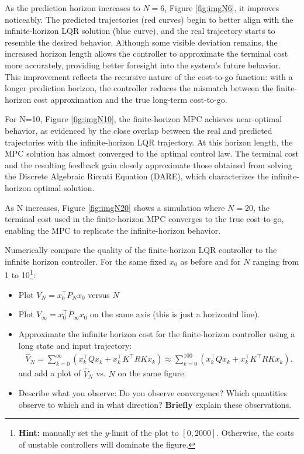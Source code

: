 \documentclass[]{article}
\begin{document}
As the prediction horizon increases to $N=6$, Figure \ref{fig:imgN6}, it improves noticeably. 
The predicted trajectories (red curves) begin to better align with the infinite-horizon LQR solution (blue curve), and the real trajectory starts to resemble the desired behavior. 
Although some visible deviation remains, the increased horizon length allows the controller to approximate the terminal cost more accurately, providing better foresight into the system's future behavior. 
This improvement reflects the recursive nature of the cost-to-go function: with a longer prediction horizon, the controller reduces the mismatch between the finite-horizon cost approximation and the true long-term cost-to-go.

For N=10, Figure \ref{fig:imgN10}, the finite-horizon MPC achieves near-optimal behavior, as evidenced by the close overlap between the real and predicted trajectories with the infinite-horizon LQR trajectory. 
At this horizon length, the MPC solution has almost converged to the optimal control law. 
The terminal cost and the resulting feedback gain closely approximate those obtained from solving the Discrete Algebraic Riccati Equation (DARE), which characterizes the infinite-horizon optimal solution. 

As N increases, Figure \ref{fig:imgN20} shows a simulation where $N=20$, the terminal cost used in the finite-horizon MPC converges to the true cost-to-go, enabling the MPC to replicate the infinite-horizon behavior.

\begin{assignment}
	Numerically compare the quality of the finite-horizon LQR controller to the infinite horizon controller. 
	For the same fixed $x_0$ as before and for $N$ ranging from 1 to 10\footnote{\textbf{Hint:} manually set the $y$-limit of the plot to $[0, 2000]$. Otherwise, the costs of unstable controllers will dominate the figure.}: 
\begin{itemize}
	\item Plot $V_{N} = x_0^\top P_N x_0$ versus $N$
	\item Plot $V_{\infty} = x_0^\top P_{\infty} x_0$ on the same axis (this is just a horizontal line).
	\item Approximate the infinite horizon cost for the finite-horizon controller using a long state and input trajectory:
		\begin{align} \nonumber
			\hat{V}_{N} = \sum_{k=0}^\infty(x_k^\top Q x_k + x_k^\top K^\top R K x_k) \approx \sum_{k=0}^{100}(x_k^\top Q x_k + x_k^\top K^\top R K x_k). 
		\end{align}
	and add a plot of $\hat{V}_N$ vs. $N$ on the same figure.
	\item Describe what you observe: Do you observe convergence? Which quantities observe to which and in what direction? \textbf{Briefly} explain these observations.
\end{itemize}
\end{assignment}
\end{document}

